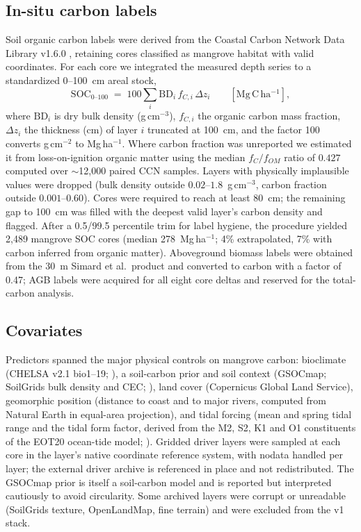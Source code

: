 \documentclass[twocolumn,9pt]{extarticle}
\begin{document}
\subsection*{In-situ carbon labels}
Soil organic carbon labels were derived from the Coastal Carbon Network Data Library
v1.6.0 \cite{ccn2024}, retaining cores classified as mangrove habitat with valid
coordinates. For each core we integrated the measured depth series to a standardized
0--100~cm areal stock,
\begin{equation}
\mathrm{SOC}_{0\text{--}100} \;=\; 100 \sum_i \mathrm{BD}_i \, f_{C,i}\, \Delta z_i
\qquad [\mathrm{Mg\,C\,ha^{-1}}],
\label{eq:soc}
\end{equation}
where $\mathrm{BD}_i$ is dry bulk density (g\,cm$^{-3}$), $f_{C,i}$ the organic carbon
mass fraction, $\Delta z_i$ the thickness (cm) of layer $i$ truncated at 100~cm, and
the factor 100 converts g\,cm$^{-2}$ to Mg\,ha$^{-1}$. Where carbon fraction was
unreported we estimated it from loss-on-ignition organic matter using the median
$f_C/f_{OM}$ ratio of $0.427$ computed over $\sim$12{,}000 paired CCN samples. Layers
with physically implausible values were dropped (bulk density outside
$0.02$--$1.8$~g\,cm$^{-3}$, carbon fraction outside $0.001$--$0.60$). Cores were
required to reach at least 80~cm; the remaining gap to 100~cm was filled with the
deepest valid layer's carbon density and flagged. After a 0.5/99.5 percentile trim for
label hygiene, the procedure yielded 2{,}489 mangrove SOC cores (median
278~Mg\,ha$^{-1}$; 4\% extrapolated, 7\% with carbon inferred from organic matter).
Aboveground biomass labels were obtained from the 30~m Simard et al.\ product
\cite{simard2019,simard2019data} and converted to carbon with a factor of 0.47; AGB
labels were acquired for all eight core deltas and reserved for the total-carbon
analysis.

\subsection*{Covariates}
Predictors spanned the major physical controls on mangrove carbon: bioclimate (CHELSA
v2.1 bio1--19; \cite{karger2017chelsa}), a soil-carbon prior and soil context
(GSOCmap; SoilGrids bulk density and CEC; \cite{poggio2021soilgrids}), land cover
(Copernicus Global Land Service), geomorphic position (distance to coast and to major
rivers, computed from Natural Earth in equal-area projection), and tidal forcing (mean
and spring tidal range and the tidal form factor, derived from the M2, S2, K1 and O1
constituents of the EOT20 ocean-tide model; \cite{hartdavis2021eot20}). Gridded
driver layers were sampled at each core in the layer's native coordinate reference
system, with nodata handled per layer; the external driver archive is referenced in
place and not redistributed. The GSOCmap prior is itself a soil-carbon model and is
reported but interpreted cautiously to avoid circularity. Some archived layers were
corrupt or unreadable (SoilGrids texture, OpenLandMap, fine terrain) and were excluded
from the v1 stack.
\end{document}
